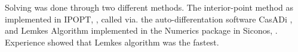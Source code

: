 Solving  was done through two different methods. The interior-point method as implemented in IPOPT, \citep{wachter2006implementation}, called via. the auto-differentation software CasADi \citep{Andersson2019}, and Lemkes Algorithm implemented in the Numerics package in Siconos, \citep{acary2019introduction}. Experience showed that Lemkes algorithm was the fastest.

